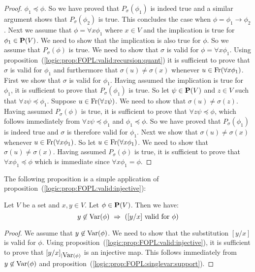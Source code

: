 \begin{proof}
    $\phi_{1}\preceq\phi$. So we have proved that $P_{\sigma}(\phi_{1})$
    is indeed true and a similar argument shows that
    $P_{\sigma}(\phi_{2})$ is true. This concludes the case when
    $\phi=\phi_{1}\to\phi_{2}$. Next we assume that $\phi=\forall
    x\phi_{1}$ where $x\in V$ and the implication is true for
    $\phi_{1}\in\mbox{${\bf P}(V)$}$. We need to show that the implication is also true
    for $\phi$. So we assume that $P_{\sigma}(\phi)$ is true. We need to
    show that $\sigma$ is valid for $\phi=\forall x\phi_{1}$. Using
    proposition~(\ref{logic:prop:FOPL:valid:recursion:quant}) it is
    sufficient to prove that $\sigma$ is valid for $\phi_{1}$ and
    furthermore that $\sigma(u)\neq\sigma(x)$ whenever
    $u\in\mbox{\rm Fr}(\forall x\phi_{1})$. First we show that $\sigma$ is valid
    for $\phi_{1}$. Having assumed the implication is true for
    $\phi_{1}$, it is sufficient to prove that $P_{\sigma}(\phi_{1})$ is
    true. So let $\psi\in\mbox{${\bf P}(V)$}$ and $z\in V$ such that $\forall
    z\psi\preceq\phi_{1}$. Suppose $u\in\mbox{\rm Fr}(\forall z\psi)$. We need
    to show that $\sigma(u)\neq\sigma(z)$. Having assumed
    $P_{\sigma}(\phi)$ is true, it is sufficient to prove that $\forall
    z\psi\preceq\phi$, which follows immediately from $\forall
    z\psi\preceq\phi_{1}$ and $\phi_{1}\preceq\phi$. So we have proved
    that $P_{\sigma}(\phi_{1})$ is indeed true and $\sigma$ is therefore
    valid for $\phi_{1}$. Next we show that $\sigma(u)\neq\sigma(x)$
    whenever $u\in\mbox{\rm Fr}(\forall x\phi_{1})$. So let $u\in\mbox{\rm Fr}(\forall
    x\phi_{1})$. We need to show that $\sigma(u)\neq\sigma(x)$. Having
    assumed $P_{\sigma}(\phi)$ is true, it is sufficient to prove that
    $\forall x\phi_{1}\preceq\phi$ which is immediate since $\forall
    x\phi_{1}=\phi$.
\end{proof}

The following proposition is a simple application of
proposition~(\ref{logic:prop:FOPL:valid:injective}):

\begin{prop}\label{logic:prop:FOPL:validsub:singlevar}
    Let $V$ be a set and $x,y\in V$. Let $\phi\in\mbox{${\bf P}(V)$}$. Then we have:
    \[
        y\not\in\var(\phi)\ 
            \Rightarrow\ 
        (\mbox{$[y/x]$ valid for $\phi$})
    \]
\end{prop}
\begin{proof}
We assume that $y\not\in\mbox{\rm Var}(\phi)$. We need to show that the
substitution $[y/x]$ is valid for $\phi$. Using
proposition~(\ref{logic:prop:FOPL:valid:injective}), it is
sufficient to prove that $[y/x]_{|\mbox{\rm Var}(\phi)}$ is an injective map.
This follows immediately from $y\not\in\mbox{\rm Var}(\phi)$ and
proposition~(\ref{logic:prop:FOPL:singlevar:support}).
\end{proof}

